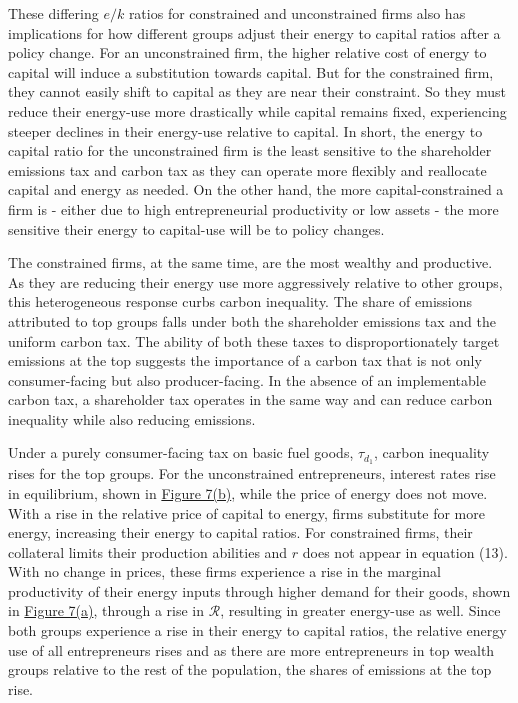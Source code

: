 \documentclass[12pt,a4paper]{article}
\begin{document}
\hspace*{6mm} These differing $e/k$ ratios for constrained and unconstrained firms also has implications for how different groups adjust their energy to capital ratios after a policy change. For an unconstrained firm, the higher relative cost of energy to capital will induce a substitution towards capital. But for the constrained firm, they cannot easily shift to capital as they are near their constraint. So they must reduce their energy-use more drastically while capital remains fixed, experiencing steeper declines in their energy-use relative to capital. In short, the energy to capital ratio for the unconstrained firm is the least sensitive to the shareholder emissions tax and carbon tax as they can operate more flexibly and reallocate capital and energy as needed. On the other hand, the more capital-constrained a firm is - either due to high entrepreneurial productivity or low assets - the more sensitive their energy to capital-use will be to policy changes. 


\hspace*{6mm} The constrained firms, at the same time, are the most wealthy and productive. As they are reducing their energy use more aggressively relative to other groups, this heterogeneous response curbs carbon inequality. The share of emissions attributed to top groups falls under both the shareholder emissions tax and the uniform carbon tax. The ability of both these taxes to disproportionately target emissions at the top  suggests the importance of a carbon tax that is not only consumer-facing but also producer-facing. In the absence of an implementable carbon tax, a shareholder tax operates in the same way and can reduce carbon inequality while also reducing emissions.

\hspace*{6mm} Under a purely consumer-facing tax on basic fuel goods, $\tau_{d_1}$, carbon inequality rises for the top groups. For the unconstrained entrepreneurs, interest rates rise in equilibrium, shown in \hyperref[fig:interest]{Figure 7(b)}, while the price of energy does not move. With a rise in the relative price of capital to energy, firms substitute for more energy, increasing their energy to capital ratios. For constrained firms, their collateral limits their production abilities and $r$ does not appear in equation (13). With no change in prices, these firms experience a rise in the marginal productivity of their energy inputs through higher demand for their goods, shown in \hyperref[fig:interest]{Figure 7(a)}, through a rise in $\mathcal{R}$, resulting in greater energy-use as well. Since both groups experience a rise in their energy to capital ratios, the relative energy use of all entrepreneurs rises and as there are more entrepreneurs in top wealth groups relative to the rest of the population, the shares of emissions at the top rise. 
\end{document}
